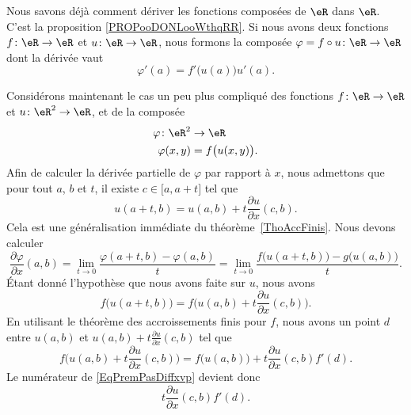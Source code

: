 Nous savons déjà comment dériver les fonctions composées de \( \eR\) dans \( \eR\). C'est la proposition \ref{PROPooDONLooWthqRR}. Si nous avons deux fonctions \( f\colon \eR\to \eR\) et \( u\colon \eR\to \eR\), nous formons la composée \( \varphi=f\circ u\colon \eR\to \eR\) dont la dérivée vaut
\begin{equation}
	\varphi'(a)=f'\big( u(a) \big)u'(a).
\end{equation}

Considérons maintenant le cas un peu plus compliqué des fonctions \( f\colon \eR\to \eR\) et \( u\colon \eR^2\to \eR\), et de la composée
\begin{equation}
	\begin{aligned}
		\varphi\colon \eR^2 & \to \eR                \\
		\varphi(x,y)        & = f\big( u(x,y) \big).
	\end{aligned}
\end{equation}
Afin de calculer la dérivée partielle de \( \varphi\) par rapport à \( x\), nous admettons que pour tout \( a\), \( b\) et \( t\), il existe \( c\in\mathopen[ a , a+t \mathclose]\) tel que
\begin{equation}
	u(a+t,b)=u(a,b)+t\frac{ \partial u }{ \partial x }(c,b).
\end{equation}
Cela est une généralisation immédiate du théorème~\ref{ThoAccFinis}. Nous devons calculer
\begin{equation}		\label{EqPremPasDiffxvp}
	\frac{ \partial \varphi }{ \partial x }(a,b)=\lim_{t\to 0} \frac{ \varphi(a+t,b)-\varphi(a,b) }{ t }=\lim_{t\to 0} \frac{ f\big( u(a+t,b) \big)-g\big( u(a,b) \big) }{ t }.
\end{equation}
Étant donné l'hypothèse que nous avons faite sur \( u\), nous avons
\begin{equation}
	f\big( u(a+t,b) \big)=f\big( u(a,b)+t\frac{ \partial u }{ \partial x }(c,b) \big).
\end{equation}
En utilisant le théorème des accroissements finis pour \( f\), nous avons un point \( d\) entre \( u(a,b)\) et \( u(a,b)+t\frac{ \partial u }{ \partial x }(c,b)\) tel que
\begin{equation}
	f\big( u(a,b)+t\frac{ \partial u }{ \partial x }(c,b) \big)=f\big( u(a,b) \big)+t\frac{ \partial u }{ \partial x }(c,b)f'(d).
\end{equation}
Le numérateur de \eqref{EqPremPasDiffxvp} devient donc
\begin{equation}
	t\frac{ \partial u }{ \partial x }(c,b)f'(d).
\end{equation}
